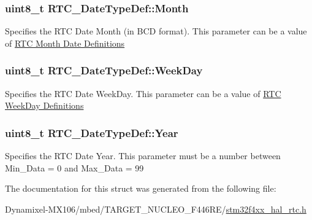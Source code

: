 \subsubsection[{\texorpdfstring{Month}{Month}}]{\setlength{\rightskip}{0pt plus 5cm}uint8\+\_\+t R\+T\+C\+\_\+\+Date\+Type\+Def\+::\+Month}\hypertarget{struct_r_t_c___date_type_def_a3df66a922683acd4db5defe402c664a0}{}\label{struct_r_t_c___date_type_def_a3df66a922683acd4db5defe402c664a0}
Specifies the R\+TC Date Month (in B\+CD format). This parameter can be a value of \hyperlink{group___r_t_c___month___date___definitions}{R\+TC Month Date Definitions} 
\subsubsection[{\texorpdfstring{Week\+Day}{WeekDay}}]{\setlength{\rightskip}{0pt plus 5cm}uint8\+\_\+t R\+T\+C\+\_\+\+Date\+Type\+Def\+::\+Week\+Day}\hypertarget{struct_r_t_c___date_type_def_aff0238fae9aa5fe6dc30ca2833878e45}{}\label{struct_r_t_c___date_type_def_aff0238fae9aa5fe6dc30ca2833878e45}
Specifies the R\+TC Date Week\+Day. This parameter can be a value of \hyperlink{group___r_t_c___week_day___definitions}{R\+TC Week\+Day Definitions} 
\subsubsection[{\texorpdfstring{Year}{Year}}]{\setlength{\rightskip}{0pt plus 5cm}uint8\+\_\+t R\+T\+C\+\_\+\+Date\+Type\+Def\+::\+Year}\hypertarget{struct_r_t_c___date_type_def_a1e7d226d1da13713b7d6bbd18c00bd9b}{}\label{struct_r_t_c___date_type_def_a1e7d226d1da13713b7d6bbd18c00bd9b}
Specifies the R\+TC Date Year. This parameter must be a number between Min\+\_\+\+Data = 0 and Max\+\_\+\+Data = 99 

The documentation for this struct was generated from the following file\+:\begin{DoxyCompactItemize}
\item 
Dynamixel-\/\+M\+X106/mbed/\+T\+A\+R\+G\+E\+T\+\_\+\+N\+U\+C\+L\+E\+O\+\_\+\+F446\+R\+E/\hyperlink{stm32f4xx__hal__rtc_8h}{stm32f4xx\+\_\+hal\+\_\+rtc.\+h}\end{DoxyCompactItemize}
